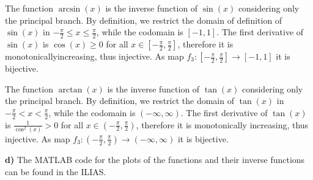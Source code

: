 {\begin{iii}
\item
The function $\arcsin(x)$ is the inverse function of $\sin(x)$ considering only the principal branch.
By definition, we restrict the domain of definition of $\sin(x)$ in $-\frac{\pi}{2} \leq x \leq \frac{\pi}{2}$, 
while the codomain is $[-1,1]$.
The first derivative of $\sin(x)$ is $\cos(x) \geq 0$ for all $x \in [-\frac{\pi}{2},\frac{\pi}{2}]$,
therefore it is monotonicallyincreasing, thus injective.
As map $f_3 : [-\frac{\pi}{2},\frac{\pi}{2}] \to [-1,1]$ it is bijective.
\newpage
\item
The function $\arctan(x)$ is the inverse function of $\tan(x)$ considering only the principal branch. 
By definition, we restrict the domain of $\tan(x)$ in $-\frac{\pi}{2}< x <\frac{\pi}{2}$, 
while the codomain is $(-\infty,\infty)$.
The first derivative of $\tan(x)$ is $\frac{1}{\cos^2(x)} > 0$ for all $x \in (-\frac{\pi}{2},\frac{\pi}{2})$, therefore it is monotonically
increasing, thus injective. As map $f_3 : (-\frac{\pi}{2},\frac{\pi}{2}) \to (-\infty,\infty)$ it is bijective.
\textbf{d)} 
The MATLAB code for the plots of the functions and their inverse functions can be found in the ILIAS.


\end{iii}}
